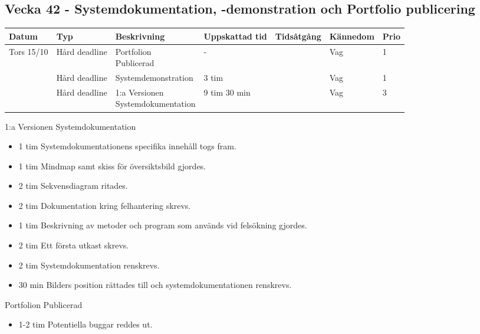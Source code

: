 \documentclass{TDP003mall}
\begin{document}
\subsection*{Vecka 42 - Systemdokumentation, -demonstration och Portfolio publicering}
\begin{tabularx}{\linewidth}{|l|l|X|l|l|l|l|}
  \hline
  Datum            & Typ           & Beskrivning                                         & Uppskattad tid & Tidsåtgång & Kännedom & Prio \\ [0.5ex]
  \hline                                             
        Tors 15/10 & Hård deadline & \makecell[tl]{Portfolion\\ Publicerad}              & -              &            & Vag      & 1 \\ \hline
                   & Hård deadline & Systemdemonstration                                 & 3 tim          &            & Vag      & 1    \\
  \hline                                             
                   & Hård deadline & \makecell[tl]{1:a Versionen \\ Systemdokumentation} & 9 tim 30 min   &            & Vag      & 3 \\
  \hline
\end{tabularx}

1:a Versionen Systemdokumentation
\begin{itemize}
  \item 1 tim Systemdokumentationens specifika innehåll togs fram.
  \item 1 tim Mindmap samt skiss för översiktsbild gjordes.
  \item 2 tim Sekvensdiagram ritades.
  \item 2 tim Dokumentation kring felhantering skrevs.
  \item 1 tim Beskrivning av metoder och program som används vid felsökning gjordes.
  \item 2 tim Ett första utkast skrevs.
  \item 2 tim Systemdokumentation renskrevs.
  \item 30 min Bilders position rättades till och systemdokumentationen renskrevs.
\end{itemize}

Portfolion Publicerad
\begin{itemize}
\item 1-2 tim Potentiella buggar reddes ut.
  \end{itemize}
\end{document}
